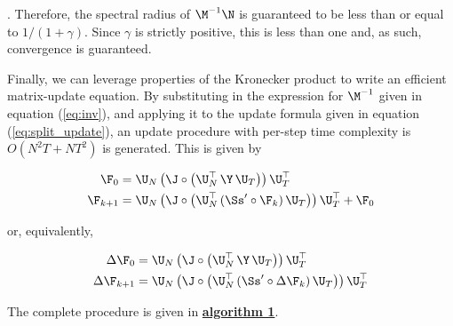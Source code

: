 \citep{Bhatia1997}. Therefore, the spectral radius of $\M^{-1}\N$ is guaranteed to be less than or equal to $1 / (1 + \gamma)$.  Since $\gamma$ is strictly positive, this is less than one and, as such, convergence is guaranteed. 

Finally, we can leverage properties of the Kronecker product to write an efficient matrix-update equation. By substituting in the expression for $\M^{-1}$ given in equation (\ref{eq:inv}), and applying it to the update formula given in equation (\ref{eq:split_update}), an update procedure with per-step time complexity is $O(N^2T + NT^2)$ is generated. This is given by 

\begin{align}
\F_0 &= \U_N \, \big( \J  \circ \big( \U_N^\top \, \Y \, \U_T \big) \big) \, \U_T^\top \notag \\ 
\F_{k+1} &= \U_N \, \big( \J  \circ \big( \U_N^\top \, (\Ss' \circ \F_{k})\, \U_T \big) \big) \, \U_T^\top + \F_0
\end{align}

or, equivalently, 

\begin{align}
\Delta \F_0 &= \U_N \, \big( \J  \circ \big( \U_N^\top \, \Y \, \U_T \big) \big) \, \U_T^\top \notag \\ 
\Delta \F_{k+1} &= \U_N \, \big( \J  \circ \big( \U_N^\top \, (\Ss' \circ \Delta \F_{k})\, \U_T \big) \big) \, \U_T^\top
\end{align}

The complete procedure is given in \hyperlink{al1}{\textbf{algorithm 1}}.

